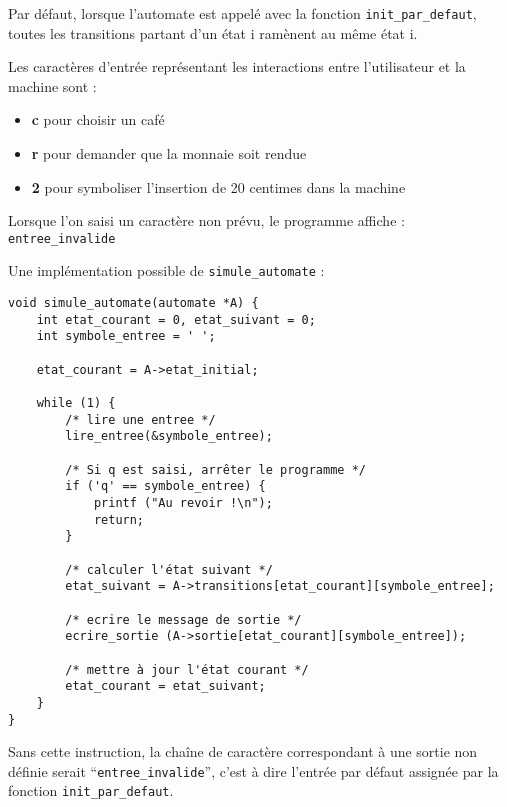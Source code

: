 \documentclass[10pt]{article}
\begin{document}
\begin{enumerate}[label=\textbf{[\alph*]}]
  \setlength\itemsep{1em}

\item Par défaut, lorsque l'automate est appelé avec la fonction
  \texttt{init\_par\_defaut}, toutes les transitions partant d'un état
  i ramènent au même état i.

\item Les caractères d'entrée représentant les interactions entre
  l'utilisateur et la machine sont :

  \begin{itemize}
  \item \textbf{c} pour choisir un café
  \item \textbf{r} pour demander que la monnaie soit rendue
  \item \textbf{2} pour symboliser l'insertion de 20 centimes dans la machine
  \end{itemize}

\item Lorsque l'on saisi un caractère non prévu, le programme affiche
  : \texttt{entree\_invalide}

\item Une implémentation possible de \texttt{simule\_automate} :

  \begin{lstlisting}
void simule_automate(automate *A) {
	int etat_courant = 0, etat_suivant = 0;
	int symbole_entree = ' ';

	etat_courant = A->etat_initial;

	while (1) {
		/* lire une entree */
		lire_entree(&symbole_entree);

		/* Si q est saisi, arrêter le programme */
		if ('q' == symbole_entree) {
			printf ("Au revoir !\n");
			return;
		}

		/* calculer l'état suivant */
		etat_suivant = A->transitions[etat_courant][symbole_entree];

		/* ecrire le message de sortie */
		ecrire_sortie (A->sortie[etat_courant][symbole_entree]);

		/* mettre à jour l'état courant */
		etat_courant = etat_suivant;
	}
}
  \end{lstlisting}

\item Sans cette instruction, la chaîne de caractère correspondant à
  une sortie non définie serait ``\texttt{entree\_invalide}'', c'est à
  dire l'entrée par défaut assignée par la fonction \texttt{init\_par\_defaut}.


\end{enumerate}
\end{document}
